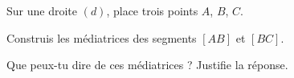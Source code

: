 Sur une droite $(d)$, place trois points $A$, $B$, $C$.
\begin{myenumerate}
\item Construis les médiatrices des segments $[AB]$ et $[BC]$.
\item Que peux-tu dire de ces médiatrices ? Justifie la réponse.
\end{myenumerate}